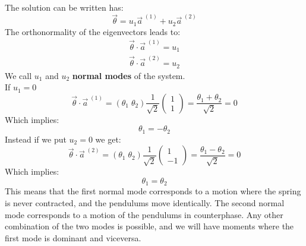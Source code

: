 The solution can be written has:
\begin{equation}
    \vec{\theta} = u_1\vec{a}^{\;(1)}+u_2\vec{a}^{\;(2)}
\end{equation}
The orthonormality of the eigenvectors leads to:
\begin{equation}
    \begin{split}
        \vec{\theta} \cdot \vec{a}^{\;(1)} = u_1\\[8pt]
        \vec{\theta} \cdot \vec{a}^{\;(2)} = u_2
    \end{split}
\end{equation}
We call $u_1$ and $u_2$ \textbf{normal modes} of the system.\\
If $u_1 =0$
\begin{equation}
    \vec{\theta} \cdot \vec{a}^{\;(1)} = (\theta_1\;\theta_2)\dfrac{1}{\sqrt{2}}\begin{pmatrix}
        1\\[8pt]
        1
    \end{pmatrix} = \dfrac{\theta_1 + \theta_2}{\sqrt{2}} = 0
\end{equation}
Which implies:
\begin{equation}
    \theta_1 = -\theta_2
\end{equation}
Instead if we put $u_2=0$ we get:
\begin{equation}
    \vec{\theta} \cdot \vec{a}^{\;(2)} = (\theta_1\;\theta_2)\dfrac{1}{\sqrt{2}}\begin{pmatrix}
        1\\[8pt]
        -1
    \end{pmatrix} = \dfrac{\theta_1 - \theta_2}{\sqrt{2}} = 0
\end{equation}
Which implies:
\begin{equation}
    \theta_1 = \theta_2
\end{equation}
This means that the first normal mode corresponds to a motion where the spring is never contracted, and the pendulums move identically. The second normal mode corresponds to a motion of the pendulums in counterphase. Any other combination of the two modes is possible, and we will have moments where the first mode is dominant and viceversa.
